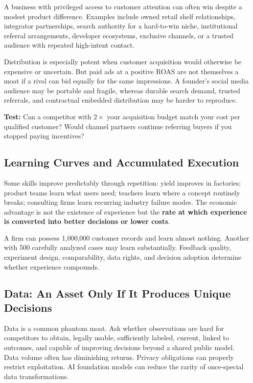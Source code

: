 A business with privileged access to customer attention can often win despite a modest product difference. Examples include owned retail shelf relationships, integrator partnerships, search authority for a hard-to-win niche, institutional referral arrangements, developer ecosystems, exclusive channels, or a trusted audience with repeated high-intent contact.

Distribution is especially potent when customer acquisition would otherwise be expensive or uncertain. But paid ads at a positive ROAS are not themselves a moat if a rival can bid equally for the same impressions. A founder's social media audience may be portable and fragile, whereas durable search demand, trusted referrals, and contractual embedded distribution may be harder to reproduce.

\textbf{Test:} Can a competitor with $2\times$ your acquisition budget match your cost per qualified customer? Would channel partners continue referring buyers if you stopped paying incentives?

\subsection{Learning Curves and Accumulated Execution}
\label{sec:learning_curves_execution}

Some skills improve predictably through repetition: yield improves in factories; product teams learn what users need; teachers learn where a concept routinely breaks; consulting firms learn recurring industry failure modes. The economic advantage is not the existence of experience but the \textbf{rate at which experience is converted into better decisions or lower costs}.

A firm can possess 1,000,000 customer records and learn almost nothing. Another with 500 carefully analyzed cases may learn substantially. Feedback quality, experiment design, comparability, data rights, and decision adoption determine whether experience compounds.

\subsection{Data: An Asset Only If It Produces Unique Decisions}
\label{sec:data_unique_decisions}

Data is a common phantom moat. Ask whether observations are hard for competitors to obtain, legally usable, sufficiently labeled, current, linked to outcomes, and capable of improving decisions beyond a shared public model. Data volume often has diminishing returns. Privacy obligations can properly restrict exploitation. AI foundation models can reduce the rarity of once-special data transformations.

